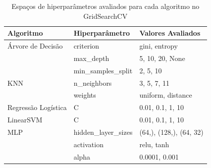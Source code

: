 \begin{table}[ht]
\centering
\caption{Espaços de hiperparâmetros avaliados para cada algoritmo no GridSearchCV}
\label{tab:hiperparametros}
\begin{tabular}{lll}
\toprule
\textbf{Algoritmo} & \textbf{Hiperparâmetro} & \textbf{Valores Avaliados} \\
\midrule

Árvore de Decisão & criterion & gini, entropy \\
                  & max\_depth & 5, 10, 20, None \\
                  & min\_samples\_split & 2, 5, 10 \\
\midrule

KNN & n\_neighbors & 3, 5, 7, 11 \\
    & weights & uniform, distance \\
\midrule

Regressão Logística & C & 0.01, 0.1, 1, 10 \\
\midrule

LinearSVM & C & 0.01, 0.1, 1, 10 \\
\midrule

MLP & hidden\_layer\_sizes & (64,), (128,), (64, 32) \\
    & activation & relu, tanh \\
    & alpha & 0.0001, 0.001 \\
\bottomrule
\end{tabular}
\end{table}